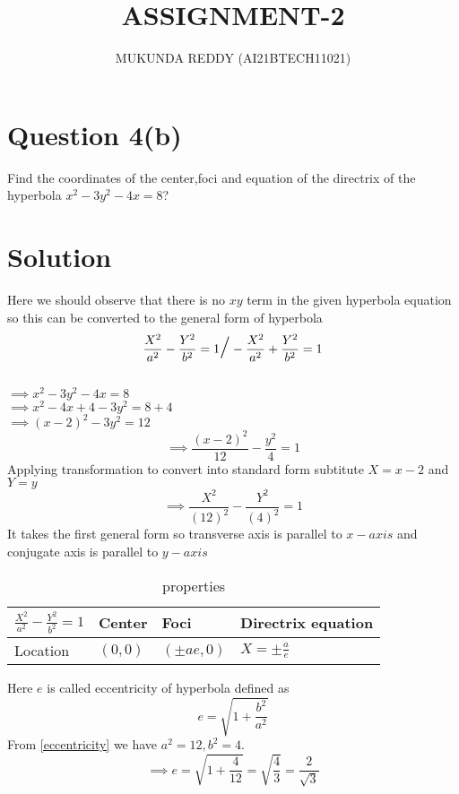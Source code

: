 \documentclass[journal,12pt,a4paper]{article}
\newcommand{\generaleqa}{\frac{X^2}{a^2} - \frac{Y^2}{b^2} = 1}
\newcommand{\generaleqb}{-\frac{X^2}{a^2} + \frac{Y^2}{b^2} = 1}
\newcommand{\subtitute}[2]{\frac{X^2}{(#1)^2} - \frac{Y^2}{(#2)^2} = 1}
\begin{document}
\title{ASSIGNMENT-2}
\author{MUKUNDA REDDY (AI21BTECH11021)}
\date{}
\maketitle
\begin{multicols}{2}
\section*{\Large{Question 4(b)}}
Find the coordinates of the center,foci and equation of
the directrix of the hyperbola
$x^{2}-3y^{2}-4x=8$?\\
 \hline
\section*{Solution}
Here we should observe that there is no $xy$ term in the
given hyperbola equation so this can be converted to the
general form of hyperbola $$\generaleqa   \text{\LARGE$/$} \generaleqb$$\\

$\implies x^2-3y^2-4x = 8$\\
$\implies x^2-4x+4-3y^2 = 8+4$\\
$\implies (x-2)^2-3y^2 = 12$\\
\begin{equation}
\implies \frac{(x-2)^2}{12}-\frac{y^2}{4} = 1
\end{equation}
Applying transformation to convert into standard form
subtitute $X=x-2$ and $Y = y$ $$\implies \subtitute{12}{4} $$
It takes the first general form so transverse axis is parallel
to $x-axis$ and conjugate axis is parallel to $y-axis$
\columnbreak
\begin{table}[H]
    \centering
    \hline
    \renewcommand{\arraystretch}{2}
    \begin{tabular}{|p{2.2cm}|p{1.2cm}|p{1.2cm}|p{1.7cm}|}
    $\generaleqa$  & Center & Foci & Directrix equation\\ \hline
      Location  &   $(0,0)$ & $(\pm ae,0)$ & $X=\pm \frac{a}{e}$\\ \hline
    \end{tabular}
    \caption{properties}
\end{table}
Here $e$ is called eccentricity of hyperbola defined as
\begin{equation}
\label{eccentricity}
 e=\sqrt{1+\frac{b^2}{a^2}} 
\end{equation}
From \eqref{eccentricity} we have $a^2 = 12 , b^2 = 4$.
$$\implies e = \sqrt{1+\frac{4}{12}}=\sqrt{\frac{4}{3}}=\frac{2}{\sqrt{3}}$$

\end{multicols}
\end{document}
